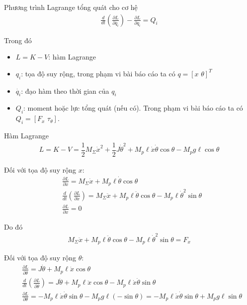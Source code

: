             Phương trình Lagrange tổng quát cho cơ hệ
            \begin{align}
                \frac{d}{dt} \left( \frac{\partial L}{\partial \dot{q_i}} \right) - \frac{\partial L}{\partial q_i} = Q_i
            \end{align}

            Trong đó
            \begin{itemize}
                \item $L = K - V$: hàm Lagrange
                \item $q_i$: tọa độ suy rộng, trong phạm vi bài báo cáo ta có $q = [x \,\, \theta]^T$
                \item $\dot{q_i}$: đạo hàm theo thời gian của $q_i$
                \item $Q_i$: moment hoặc lực tổng quát (nếu có). Trong phạm vi bài báo cáo ta có $Q_i = [F_x \,\, \tau_\theta]$.
            \end{itemize}

            Hàm Lagrange
            \begin{align}
                L = K - V = \dfrac{1}{2} M_{\Sigma} \dot{x}^2 + \dfrac{1}{2} J \dot{\theta}^2 + M_p \ell \dot{x} \dot{\theta} \cos \theta - M_p g \ell \cos \theta 
            \end{align}    

            Đối với tọa độ suy rộng $x$:
            \begin{align*}
                &\frac{\partial L}{\partial \dot{x}} = M_{\Sigma} \dot{x} + M_p \ell \dot{\theta} \cos \theta\\
                &\frac{d}{dt} \left( \frac{\partial L}{\partial \dot{x}} \right) = M_{\Sigma} \ddot{x} + M_p \ell \ddot{\theta} \cos \theta - M_p \ell \dot{\theta}^2 \sin \theta\\
                &\frac{\partial L}{\partial x} = 0
            \end{align*}

            Do đó
            \begin{align}
                M_{\Sigma} \ddot{x} + M_p \ell \ddot{\theta} \cos \theta - M_p \ell \dot{\theta}^2 \sin \theta = F_x
            \end{align}


            Đối với tọa độ suy rộng $\theta$:
            \begin{align*}
                &\frac{\partial L}{\partial \dot{\theta}} = J \dot{\theta} + M_p \ell \dot{x} \cos \theta\\
                &\frac{d}{dt} \left( \frac{\partial L}{\partial \dot{\theta}} \right) = J \ddot{\theta} + M_p \ell \ddot{x} \cos \theta - M_p \ell \dot{x} \dot{\theta} \sin \theta\\
                &\frac{\partial L}{\partial \theta} = -M_p \ell \dot{x} \dot{\theta} \sin \theta - M_p g \ell (-\sin \theta) = -M_p \ell \dot{x} \dot{\theta} \sin \theta + M_p g \ell \sin \theta
            \end{align*}

